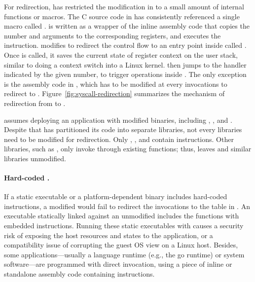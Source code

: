 For \linuxapi{} redirection,
\graphene{} has restricted the modification in \glibc{}
to a small amount of
internal functions or macros.
The C source code in \glibc{} has consistently referenced a single macro called
.
 is written as a wrapper of the inline assembly code
that copies the \linuxapi{} number and arguments to the corresponding registers,
and executes the  instruction.
\graphene{} modifies 
to redirect the control flow to
an entry point inside \thelibos{} called .
Once  is called, it saves the current state of register context on the user stack, similar to doing a context switch into a Linux kernel.
 then jumps to the \linuxapi{} handler
indicated by the given \linuxapi{} number, to trigger operations inside \thelibos{}.
The only exception is the assembly code in \glibc{}, which has
to be modified at every \linuxapi{} invocations to redirect to .
Figure~\ref{fig:syscall-redirection} summarizes the mechanism of \linuxapi{} redirection
from \glibc{} to \thelibos{}.


\graphene{} assumes deploying an application %
with modified \glibc{} binaries,
including , \libpthread{}, and \libdl{}.
Despite that \glibc{} has partitioned its code into separate libraries, not every libraries need to be modified for \linuxapi{} redirection.
Only , \libpthread{}, and \libdl{} contain  instructions.
Other \libc{} libraries, such as ,
only invoke \linuxapis{} through existing \libc{} functions;
thus, \graphene{} leaves  and similar \libc{} libraries unmodified.



\paragraph{Hard-coded \linuxapis{}.}
If a static executable or a platform-dependent binary
includes hard-coded  instructions,
a modified \libc{} would fail to redirect the \linuxapi{} invocations to the \linuxapi{} table in \thelibos{}. %
An executable
statically linked against an unmodified \libc{}
includes
the \libc{} functions
with embedded  instructions.
Running these static executables with \graphene{} causes a security risk
of exposing the host resources and states to the application,
or a compatibility issue of corrupting the guest OS view on a Linux host.
Besides, some applications---usually a language runtime (e.g., the go runtime)
or system software---are programmed
with direct \linuxapi{} invocation,
using a piece of inline or standalone assembly code
containing
 instructions.


